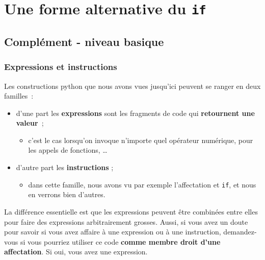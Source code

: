     
    
    
    

    

    \hypertarget{une-forme-alternative-du-if}{%
\section{\texorpdfstring{Une forme alternative du
\texttt{if}}{Une forme alternative du if}}\label{une-forme-alternative-du-if}}

    \hypertarget{compluxe9ment---niveau-basique}{%
\subsection{Complément - niveau
basique}\label{compluxe9ment---niveau-basique}}

    \hypertarget{expressions-et-instructions}{%
\subsubsection{Expressions et
instructions}\label{expressions-et-instructions}}

    Les constructions python que nous avons vues jusqu'ici peuvent se ranger
en deux familles~:

\begin{itemize}
\tightlist
\item
  d'une part les \textbf{expressions} sont les fragments de code qui
  \textbf{retournent une valeur}~;

  \begin{itemize}
  \tightlist
  \item
    c'est le cas lorsqu'on invoque n'importe quel opérateur numérique,
    pour les appels de fonctions, \ldots{}
  \end{itemize}
\item
  d'autre part les \textbf{instructions} ;

  \begin{itemize}
  \tightlist
  \item
    dans cette famille, nous avons vu par exemple l'affectation et
    \texttt{if}, et nous en verrons bien d'autres.
  \end{itemize}
\end{itemize}

La différence essentielle est que les expressions peuvent être combinées
entre elles pour faire des expressions arbitrairement grosses. Aussi, si
vous avez un doute pour savoir si vous avez affaire à une expression ou
à une instruction, demandez-vous si vous pourriez utiliser ce code
\textbf{comme membre droit d'une affectation}. Si oui, vous avez une
expression.

